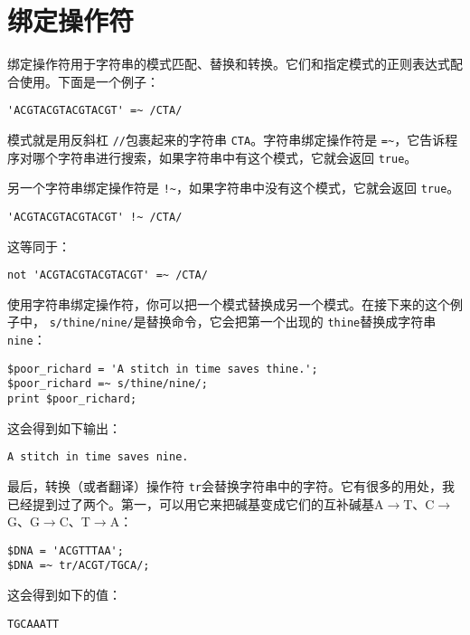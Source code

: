 \section{绑定操作符}
绑定操作符用于字符串的模式匹配、替换和转换。它们和指定模式的正则表达式配合使用。下面是一个例子：

\begin{lstlisting}
'ACGTACGTACGTACGT' =~ /CTA/
\end{lstlisting}

模式就是用反斜杠 \verb|//|包裹起来的字符串 \verb|CTA|。字符串绑定操作符是 \verb|=~|，它告诉程序对哪个字符串进行搜索，如果字符串中有这个模式，它就会返回 \verb|true|。

另一个字符串绑定操作符是 \verb|!~|，如果字符串中没有这个模式，它就会返回 \verb|true|。

\begin{lstlisting}
'ACGTACGTACGTACGT' !~ /CTA/
\end{lstlisting}

这等同于：

\begin{lstlisting}
not 'ACGTACGTACGTACGT' =~ /CTA/
\end{lstlisting}

使用字符串绑定操作符，你可以把一个模式替换成另一个模式。在接下来的这个例子中， \verb|s/thine/nine/|是替换命令，它会把第一个出现的 \verb|thine|替换成字符串 \verb|nine|：

\begin{lstlisting}
$poor_richard = 'A stitch in time saves thine.';
$poor_richard =~ s/thine/nine/;
print $poor_richard;
\end{lstlisting}

这会得到如下输出：

\begin{lstlisting}
A stitch in time saves nine.
\end{lstlisting}

最后，转换（或者翻译）操作符 \verb|tr|会替换字符串中的字符。它有很多的用处，我已经提到过了两个。第一，可以用它来把碱基变成它们的互补碱基A$\rightarrow$T、C$\rightarrow$G、G$\rightarrow$C、T$\rightarrow$A：

\begin{lstlisting}
$DNA = 'ACGTTTAA';
$DNA =~ tr/ACGT/TGCA/;
\end{lstlisting}

这会得到如下的值：

\begin{lstlisting}
TGCAAATT
\end{lstlisting}

